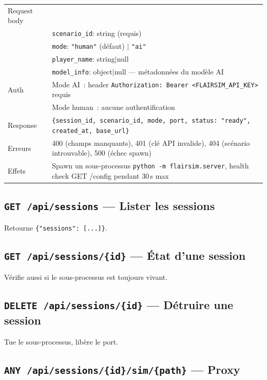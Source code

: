 \documentclass[a4paper, 11pt, french]{article}
\newcommand{\code}[1]{\texttt{#1}}
\newcommand{\apiendpoint}[2]{\texorpdfstring{\texttt{#1}~\texttt{#2}}{#1 #2}}
\begin{document}
\begin{table}[H]
\centering\small
\begin{tabular}{lp{10cm}}
\toprule
Request body & \\
& \code{scenario\_id}: string (requis) \\
& \code{mode}: \code{"human"} (défaut) $|$ \code{"ai"} \\
& \code{player\_name}: string$|$null \\
& \code{model\_info}: object$|$null --- métadonnées du modèle AI \\
\midrule
Auth & Mode AI~: header \code{Authorization: Bearer <FLAIRSIM\_API\_KEY>} requis \\
& Mode human~: aucune authentification \\
\midrule
Response & \code{\{session\_id, scenario\_id, mode, port, status: "ready",
          created\_at, base\_url\}} \\
Erreurs & 400 (champs manquants), 401 (clé API invalide), 404 (scénario
          introuvable), 500 (échec spawn) \\
\midrule
Effets & Spawn un sous-processus \code{python -m flairsim.server}, health
         check GET /config pendant 30\,s max \\
\bottomrule
\end{tabular}
\end{table}

\subsection{\apiendpoint{GET}{/api/sessions} --- Lister les sessions}

Retourne \code{\{"sessions": [...]\}}.

\subsection{\apiendpoint{GET}{/api/sessions/\{id\}} --- État d'une session}

Vérifie aussi si le sous-processus est toujours vivant.

\subsection{\apiendpoint{DELETE}{/api/sessions/\{id\}} --- Détruire une session}

Tue le sous-processus, libère le port.

\subsection{\apiendpoint{ANY}{/api/sessions/\{id\}/sim/\{path\}} --- Proxy}
\end{document}
